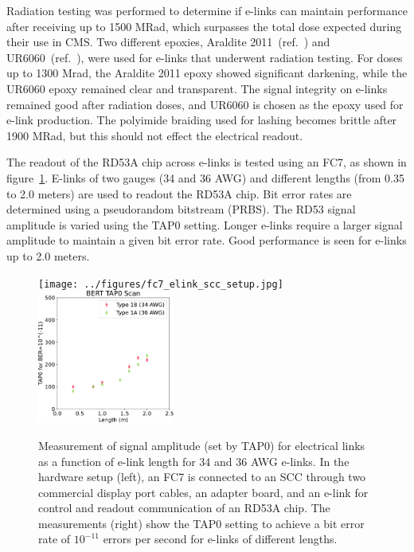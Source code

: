 \documentclass[a4paper,11pt]{article}
\begin{document}
Radiation testing was performed to determine if e-links can maintain performance after receiving up to 1500 MRad, which surpasses the total dose expected during their use in CMS.
Two different epoxies, Araldite 2011~(ref.~\cite{ref:araldite}) and UR6060~(ref.~\cite{ref:ur}), were used for e-links that underwent radiation testing.
For doses up to 1300 Mrad, the Araldite 2011 epoxy showed significant darkening, while the UR6060 epoxy remained clear and transparent.
The signal integrity on e-links remained good after radiation doses, and UR6060 is chosen as the epoxy used for e-link production.
The polyimide braiding used for lashing becomes brittle after 1900 MRad, but this should not effect the electrical readout.


The readout of the RD53A chip across e-links is tested using an FC7, as shown in figure~\ref{fig:tap0_vs_length}.
E-links of two gauges (34 and 36 AWG) and different lengths (from 0.35 to 2.0 meters) are used to readout the RD53A chip.
Bit error rates are determined using a pseudorandom bitstream (PRBS).
The RD53 signal amplitude is varied using the TAP0 setting.
Longer e-links require a larger signal amplitude to maintain a given bit error rate.
Good performance is seen for e-links up to 2.0 meters.

\begin{figure}[htbp]
\centering
\texttt{[image: ../figures/fc7\_elink\_scc\_setup.jpg]}
\qquad
\includegraphics[width=0.40\textwidth,origin=c]{../figures/BERT_TAP0_vs_Length-crop.pdf}
\caption{
\label{fig:tap0_vs_length}
Measurement of signal amplitude (set by TAP0) for electrical links as a function of e-link length for 34 and 36 AWG e-links.
In the hardware setup (left), an FC7 is connected to an SCC through two commercial display port cables, an adapter board, and an e-link for control and readout communication of an RD53A chip.
The measurements (right) show the TAP0 setting to achieve a bit error rate of $10^{-11}$ errors per second for e-links of different lengths.
}
\end{figure}
\end{document}
